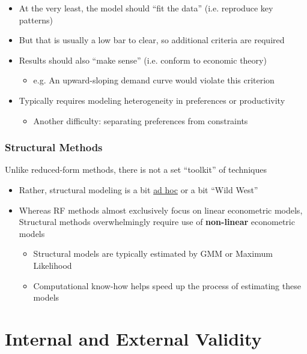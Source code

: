 \documentclass[11pt]{article}
\begin{document}
\begin{itemize}
\item At the very least, the model should ``fit the data'' (i.e. reproduce key patterns)
\item But that is usually a low bar to clear, so additional criteria are required
\item Results should also ``make sense'' (i.e. conform to economic theory)
\begin{itemize}
\item e.g. An upward-sloping demand curve would violate this criterion
\end{itemize}
\item Typically requires modeling heterogeneity in preferences or productivity
\begin{itemize}
\item Another difficulty: separating preferences from constraints
\end{itemize}
\end{itemize}

\subsubsection{Structural Methods}
\label{sec:org47311d9}

Unlike reduced-form methods, there is not a set ``toolkit'' of techniques

\begin{itemize}
\item Rather, structural modeling is a bit \uline{ad hoc} or a bit ``Wild West''

\item Whereas RF methods almost exclusively focus on linear econometric models, Structural methods overwhelmingly require use of \textbf{non-linear} econometric models
\begin{itemize}
\item Structural models are typically estimated by GMM or Maximum Likelihood
\item Computational know-how helps speed up the process of estimating these models
\end{itemize}
\end{itemize}


\section{Internal and External Validity}
\label{sec:org24fed69}
\end{document}
